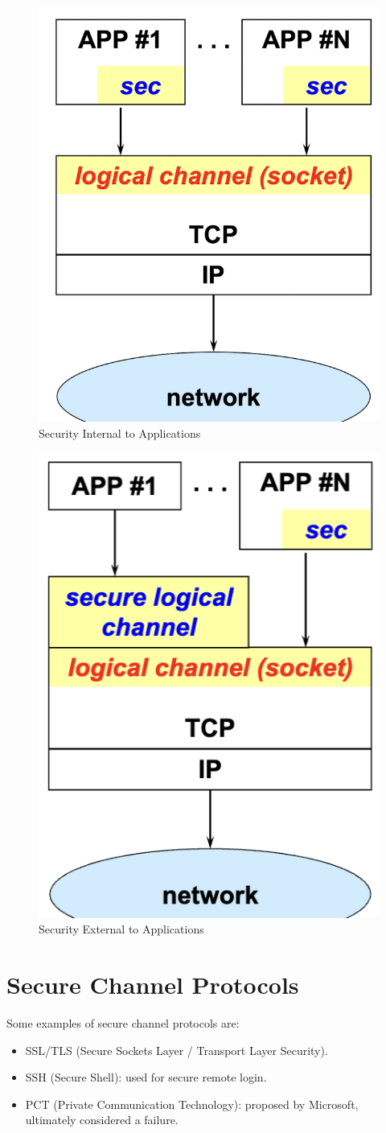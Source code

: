 \begin{multicols}{2}

    \begin{figure}[H]
        \centering
        \includegraphics[width=0.5\linewidth]{Images/Appsec/sec_app.png}
        \caption{Security Internal to Applications}
    \end{figure}
    

\columnbreak

    \begin{figure}[H]
        \centering
        \includegraphics[width=0.44\linewidth]{Images/Appsec/external_security.png}
        \caption{Security External to Applications}
    \end{figure}


\end{multicols}

\section*{Secure Channel Protocols}
Some examples of secure channel protocols are:
\begin{itemize}
    \item SSL/TLS (Secure Sockets Layer / Transport Layer Security).
    \item SSH (Secure Shell): used for secure remote login.
    \item PCT (Private Communication Technology): proposed by Microsoft, ultimately considered a failure.
\end{itemize}

